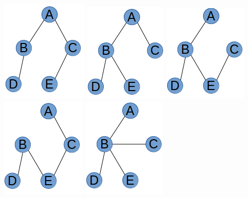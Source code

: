 \documentclass{article}
\begin{document}
\includegraphics[scale=0.5]{./P11/1}
\includegraphics[scale=0.5]{./P11/2}
\includegraphics[scale=0.5]{./P11/3}
\includegraphics[scale=0.5]{./P11/4}
\includegraphics[scale=0.5]{./P11/5}
\end{document}
